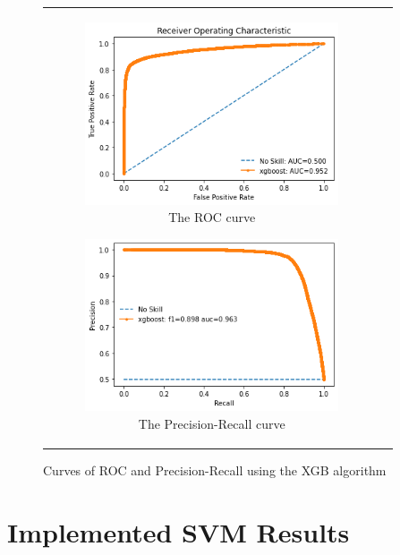 \begin{figure}[H]
\begin{tabular}{@{}cc@{}}
\begin{subfigure}{0.5\textwidth}
  \centering
  \includegraphics[width=7.5cm]{fig/chapter5/XGB/ROC_new.png}
  \caption{\footnotesize{The \acrshort{ROC} curve}}
  \label{fig:xgbroc}
\end{subfigure} 
\begin{subfigure}{0.5\textwidth}
  \centering
  \includegraphics[width=7.5cm]{fig/chapter5/XGB/Precision-Recall_new.png}
  \caption{\footnotesize{The Precision-Recall curve}}
  \label{fig:xgbprerec}
\end{subfigure} \\
\end{tabular}
\caption{Curves of \acrshort{ROC} and Precision-Recall using the \acrshort{XGB} algorithm}
\label{fig:xgbcurves}
\end{figure}

\section{Implemented SVM Results}

